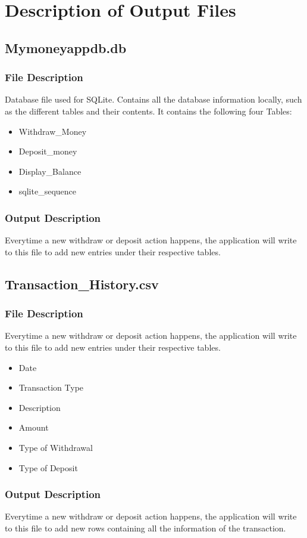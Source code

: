 \documentclass[12pt]{article}
\begin{document}
\section{Description of Output Files}

\subsection{Mymoneyappdb.db}

\subsubsection{File Description}
Database file used for SQLite. Contains all the database information locally, such as the different tables and their contents. It contains the following four Tables:
\begin{itemize}
  \item Withdraw\_Money
  \item Deposit\_money
  \item Display\_Balance
  \item sqlite\_sequence
\end{itemize}

\subsubsection{Output Description}
Everytime a new withdraw or deposit action happens, the application will write to this file to add new entries under their respective tables.  

\subsection{Transaction\_History.csv}

\subsubsection{File Description}
Everytime a new withdraw or deposit action happens, the application will write to this file to add new entries under their respective tables.  
\begin{itemize}
  \item Date
  \item Transaction Type
  \item Description
  \item Amount
  \item Type of Withdrawal
  \item Type of Deposit
\end{itemize}

\subsubsection{Output Description}
Everytime a new withdraw or deposit action happens, the application will write to this file to add new rows containing all the information of the transaction.
\end{document}
